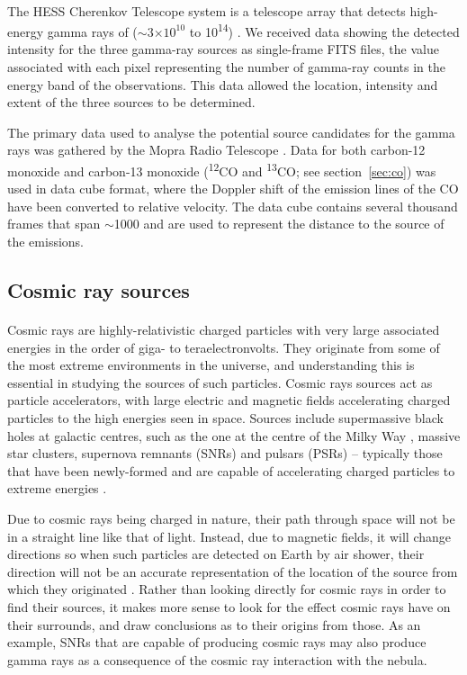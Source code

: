 \documentclass[a4paper, titlepage, oneside]{article}
\newcommand{\elem}[2]{\textsuperscript{#1}{#2}}
\newcommand{\e}[1]{\ensuremath{\times 10^{#1}}}
\begin{document}
\begin{multicols}{2}
\paragraph{} \label{sec:tel}
The HESS Cherenkov Telescope system is a telescope array that detects high-energy gamma rays of (\(\sim\)\(3\e{10}\) to \unit{10^{14}}{\electronvolt}) \parencite{Aharonian:2006}. We received data showing the detected intensity for the three gamma-ray sources as single-frame FITS files, the value associated with each pixel representing the number of gamma-ray counts in the energy band of the observations. This data allowed the location, intensity and extent of the three sources to be determined.

The primary data used to analyse the potential source candidates for the gamma rays was gathered by the Mopra Radio Telescope \parencite{Burton:2013}. Data for both carbon-12 monoxide and carbon-13 monoxide (\elem{12}{C}O and \elem{13}{C}O; see section~\ref{sec:co}) was used in data cube format, where the Doppler shift of the emission lines of the CO have been converted to relative velocity. The data cube contains several thousand frames that span \(\sim\)\unit{1000}{\kilo\meter\cdot\reciprocal\second} and are used to represent the distance to the source of the emissions.

\subsection{Cosmic ray sources}
\paragraph{} \label{sec:cr}
Cosmic rays are highly-relativistic charged particles with very large associated energies in the order of giga- to teraelectronvolts. They originate from some of the most extreme environments in the universe, and understanding this is essential in studying the sources of such particles. Cosmic rays sources act as particle accelerators, with large electric and magnetic fields accelerating charged particles to the high energies seen in space. Sources include supermassive black holes at galactic centres, such as the one at the centre of the Milky Way \parencite{Guo:2013}, massive star clusters, supernova remnants (SNRs) \parencite{Vink:2013} and pulsars (PSRs) -- typically those that have been newly-formed and are capable of accelerating charged particles to extreme energies \parencite{Fang:2012}.

Due to cosmic rays being charged in nature, their path through space will not be in a straight line like that of light. Instead, due to magnetic fields, it will change directions so when such particles are detected on Earth by air shower, their direction will not be an accurate representation of the location of the source from which they originated \parencite{Kalli:2011}. Rather than looking directly for cosmic rays in order to find their sources, it makes more sense to look for the effect cosmic rays have on their surrounds, and draw conclusions as to their origins from those. As an example, SNRs that are capable of producing cosmic rays may also produce gamma rays as a consequence of the cosmic ray interaction with the nebula.


\end{multicols}
\end{document}
